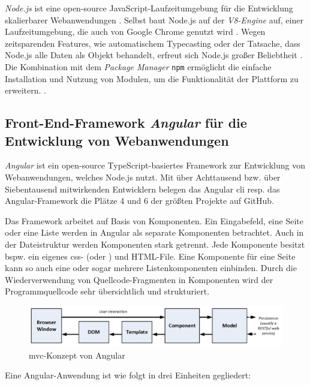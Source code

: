 \textit{Node.js} ist eine open-source JavaScript-Laufzeitumgebung für die Entwicklung skalierbarer Webanwendungen 
\cite{NodeJSWebsiteAbout}.
Selbst baut Node.js auf der \textit{V8-Engine} auf, einer Laufzeitumgebung, die auch von Google Chrome genutzt wird 
\cite[S. 1]{NodeJSRecepies}.
Wegen zeitsparenden Features, wie automatischem Typecasting oder der Tatsache, dass Node.js alle Daten als Objekt behandelt, erfreut sich Node.js großer Beliebtheit 
\cite[S. 12]{PracitalNodeJS}.
Die Kombination mit dem \textit{Package Manager} \texttt{npm} ermöglicht die einfache Installation und Nutzung von Modulen, um die Funktionalität der Plattform zu erweitern. 
\cite[S. 9]{NodeJSRecepies}.
%



\subsection{Front-End-Framework \textit{Angular} für die Entwicklung von Webanwendungen}
\textit{Angular} ist ein open-source TypeScript-basiertes Framework zur Entwicklung von Webanwendungen, welches Node.js nutzt.
Mit über Achttausend bzw. über Siebentausend mitwirkenden Entwicklern belegen das Angular \ac{cli} resp. das Angular-Framework die Plätze 4 und 6 der größten Projekte auf GitHub. 
\cite{OctoverseGitHubStatistics}

Das Framework arbeitet auf Basis von Komponenten. Ein Eingabefeld, eine Seite oder eine Liste werden in Angular als separate Komponenten betrachtet. Auch in der Dateistruktur werden Komponenten stark getrennt. Jede Komponente besitzt bspw. ein eigenes \acs{css}- (oder ) und HTML-File. Eine Komponente für eine Seite kann so auch eine oder sogar mehrere Listenkomponenten einbinden. Durch die Wiederverwendung von Quellcode-Fragmenten in Komponenten wird der Programmquellcode sehr übersichtlich und strukturiert.

\begin{figure}[h!]
	\includegraphics[width=\linewidth]{img/fig/2-4-3_Angular_MVC_Concept.jpg}
	\centering
	\caption[\acs{mvc}-Konzept von Angular]{\acs{mvc}-Konzept von Angular \cite[S. 35, Abbildung 3-4]{ProAngular}}
	\label{fig:angularmvc}
\end{figure}
Eine Angular-Anwendung ist wie folgt in drei Einheiten gegliedert:

